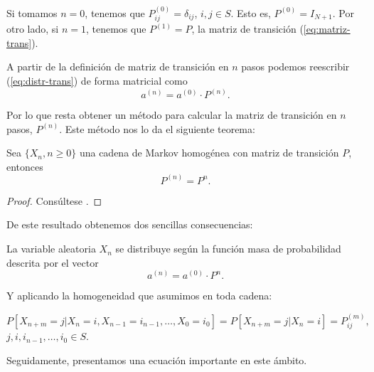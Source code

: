 \begin{observacion}
    Si tomamos $n=0$, tenemos que $P^{(0)}_{ij}=\delta_{ij}$, $i,j\in S$. Esto es, $P^{(0)}=I_{N+1}$. Por otro lado, si $n=1$, tenemos que $P^{(1)}=P$, la matriz de transición (\ref{eq:matriz-trans}).
\end{observacion}

A partir de la definición de matriz de transición en $n$ pasos podemos reescribir (\ref{eq:distr-trans}) de forma matricial como
$$
a^{(n)}= a^{(0)} \cdot P^{(n)}.
$$

Por lo que resta obtener un método para calcular la matriz de transición en $n$ pasos, $P^{(n)}$. Este método nos lo da el siguiente teorema:

\begin{teorema}
    \label{th:matriz-trans-n}
    Sea $\{X_n,n\geq 0\}$ una cadena de Markov homogénea con matriz de transición $P$, entonces
    \begin{equation}
        \label{eq:matriz-trans-n-teorema}
        P^{(n)} = P^n.
    \end{equation}    
\end{teorema}
\begin{proof}
    Consúltese \cite[Ch. II, theorem 2.2]{kulkarni-2012}.
\end{proof}

De este resultado obtenemos dos sencillas consecuencias:

\begin{corolario}
    \label{cor:fmp}
    La variable aleatoria $X_n$ se distribuye según la función masa de probabilidad descrita por el vector 
    $$
    a^{(n)} = a^{(0)}\cdot P^n.
    $$
\end{corolario}

Y aplicando la homogeneidad que asumimos en toda cadena:

\begin{corolario}
    \label{cor:Pnm}
    $$
    P[X_{n+m}=j|X_n=i,X_{n-1}=i_{n-1},\dots,X_0=i_0] = P[X_{n+m}=j|X_n=i]=P_{ij}^{(m)},
    $$
$j,i,i_{n-1},\dots,i_0\in S$.
\end{corolario}

Seguidamente, presentamos una ecuación importante en este ámbito.

